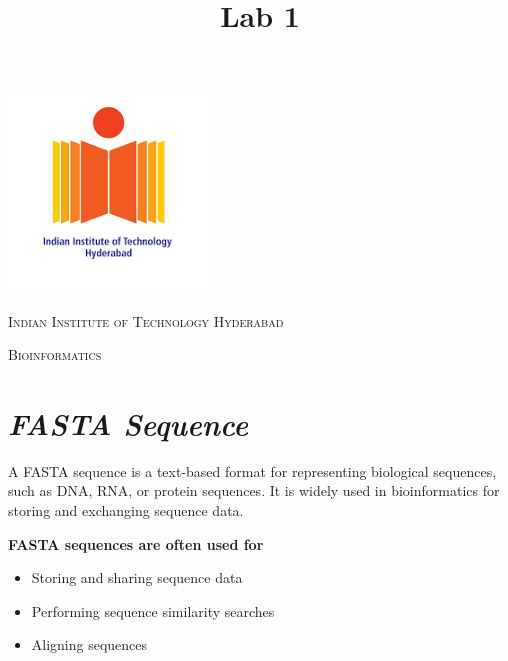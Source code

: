 \documentclass{article}
\title{Lab 1}
\begin{document}
\begin{titlepage}
  \centering
  \includegraphics[width=0.4\textwidth]{iithlogo.png}\par\vspace{1cm}
  {\scshape\LARGE Indian Institute of Technology Hyderabad \par}
  \vspace{1cm}
  {\scshape\Large Bioinformatics\par}
  \vspace{1.5cm}
\end{titlepage}

\maketitle

\newpage
\section*{\textit{FASTA Sequence}}
A FASTA sequence is a text-based format for representing biological sequences, such as DNA, RNA, or protein sequences. It is widely used in bioinformatics for storing and exchanging sequence data.
\vspace{0.5cm} %

\textbf{FASTA sequences are often used for}
\begin{itemize}
    \item Storing and sharing sequence data
    \item Performing sequence similarity searches
    \item Aligning sequences
\end{itemize}
\end{document}

